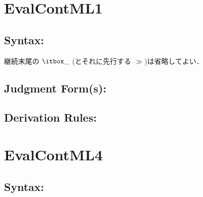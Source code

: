 \documentclass[11pt]{jarticle}
\begin{document}
\PolyTypingMLivDisplayRules

\newpage

\section*{EvalContML1}



\subsection*{Syntax:}

\EvalContMLiDisplayBNF

継続末尾の \(\Hole\) (とそれに先行する \(\gg\))は省略してよい．

\subsection*{Judgment Form(s):}


\subsection*{Derivation Rules:}
\EvalContMLiDisplayRules

\newpage

\section*{EvalContML4}



\subsection*{Syntax:}
\end{document}
